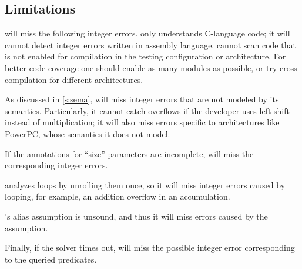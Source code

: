 \subsection{Limitations}
\label{s:gen:limit}

\sys will miss the following integer errors.
%
\sys only understands C-language code; it will cannot detect integer
errors written in assembly language.
%
\sys cannot scan code that is not enabled for compilation in the
testing configuration or architecture.  For better code coverage
one should enable as many modules as possible, or try cross compilation
for different architectures.

As discussed in \autoref{s:sema}, \sys will miss integer errors
that are not modeled by its semantics.  Particularly, it cannot catch
overflows if the developer uses left shift instead of multiplication;
it will also miss errors specific to architectures like PowerPC,
whose semantics it does not model.

If the annotations for ``size'' parameters are incomplete, \sys will
miss the corresponding integer errors.

\sys analyzes loops by unrolling them once, so it will miss integer
errors caused by looping, for example, an addition overflow in an
accumulation.

\sys's alias assumption is unsound, and thus it will miss errors
caused by the assumption.

Finally, if the solver times out, \sys will miss the possible integer
error corresponding to the queried predicates.
